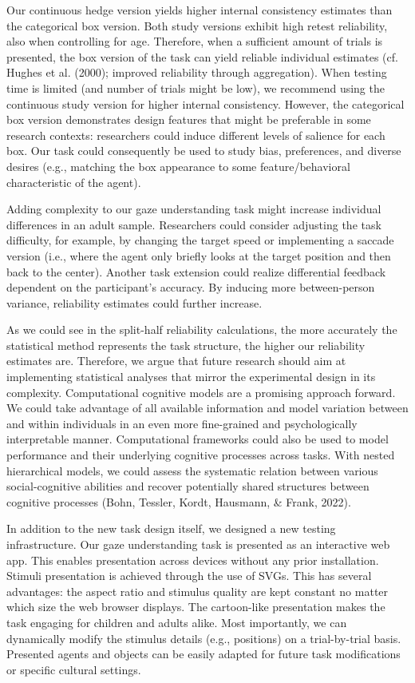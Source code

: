 \documentclass[
  man,floatsintext]{apa6}
\begin{document}
Our continuous hedge version yields higher internal consistency estimates than the categorical box version.
Both study versions exhibit high retest reliability, also when controlling for age.
Therefore, when a sufficient amount of trials is presented, the box version of the task can yield reliable individual estimates (cf. Hughes et al. (2000); improved reliability through aggregation).
When testing time is limited (and number of trials might be low), we recommend using the continuous study version for higher internal consistency.
However, the categorical box version demonstrates design features that might be preferable in some research contexts: researchers could induce different levels of salience for each box.
Our task could consequently be used to study bias, preferences, and diverse desires (e.g., matching the box appearance to some feature/behavioral characteristic of the agent).

Adding complexity to our gaze understanding task might increase individual differences in an adult sample.
Researchers could consider adjusting the task difficulty, for example, by changing the target speed or implementing a saccade version (i.e., where the agent only briefly looks at the target position and then back to the center).
Another task extension could realize differential feedback dependent on the participant's accuracy.
By inducing more between-person variance, reliability estimates could further increase.

As we could see in the split-half reliability calculations, the more accurately the statistical method represents the task structure, the higher our reliability estimates are.
Therefore, we argue that future research should aim at implementing statistical analyses that mirror the experimental design in its complexity.
Computational cognitive models are a promising approach forward.
We could take advantage of all available information and model variation between and within individuals in an even more fine-grained and psychologically interpretable manner.
Computational frameworks could also be used to model performance and their underlying cognitive processes across tasks.
With nested hierarchical models, we could assess the systematic relation between various social-cognitive abilities and recover potentially shared structures between cognitive processes (Bohn, Tessler, Kordt, Hausmann, \& Frank, 2022).

In addition to the new task design itself, we designed a new testing infrastructure.
Our gaze understanding task is presented as an interactive web app.
This enables presentation across devices without any prior installation.
Stimuli presentation is achieved through the use of SVGs.
This has several advantages: the aspect ratio and stimulus quality are kept constant no matter which size the web browser displays.
The cartoon-like presentation makes the task engaging for children and adults alike.
Most importantly, we can dynamically modify the stimulus details (e.g., positions) on a trial-by-trial basis.
Presented agents and objects can be easily adapted for future task modifications or specific cultural settings.
\end{document}
